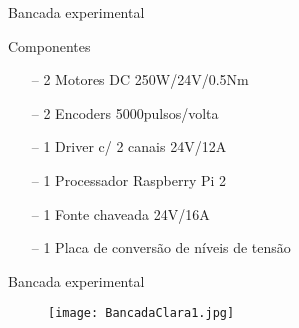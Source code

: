 \documentclass[25pt,landscape]{beamer}
\begin{document}

\begin{frame}{Bancada experimental}
    \pause
    \begin{block}{Componentes}
        \begin{itemize}
            \item[--] 2 Motores DC 250W/24V/0.5Nm \\[8pt]
            \item[--] 2 Encoders 5000pulsos/volta \\[8pt]
            \item[--] 1 Driver c/ 2 canais 24V/12A \\[8pt]
            \item[--] 1 Processador Raspberry Pi 2 \\[8pt]
            \item[--] 1 Fonte chaveada 24V/16A \\[8pt]
            \item[--] 1 Placa de convers\~ao de n\'iveis de tens\~ao \\[8pt]
        \end{itemize}
    \end{block}
\end{frame}

\begin{frame}{Bancada experimental}
    \begin{figure}[!h]
        \centering
        \texttt{[image: BancadaClara1.jpg]} \\
    \end{figure}
\end{frame}
\end{document}
